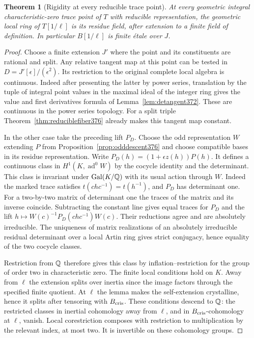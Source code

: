 \documentclass[a4paper,11pt]{article}
\newtheorem{theorem}[proposition]{Theorem}
\theoremstyle{definition}
\theoremstyle{remark}
\numberwithin{equation}{section}
\begin{document}
\begin{theorem}[Rigidity at every reducible trace point]
\label{thm:reduciblerigid379}
At every geometric integral characteristic-zero trace point
of \(T\) with reducible representation, the geometric local
ring of \(T[1/\ell]\) is its residue field, after extension
to a finite field of definition. In particular \(B[1/\ell]\)
is finite \'etale over \(J\).
\end{theorem}
\begin{proof}
Choose a finite extension \(J'\) where the point and its
constituents are rational and split. Any relative tangent
map at this point can be tested in
\(D=J'[\epsilon]/(\epsilon^2)\). Its restriction to the
original complete local algebra is continuous. Indeed after
presenting the latter by power series, translation by the
tuple of integral point values in the maximal ideal of the
integer ring gives the value and first derivatives formula
of Lemma~\ref{lem:detangent372}. These are continuous
in the power series topology. For a split triple
Theorem~\ref{thm:reduciblefiber376} already makes this
tangent map constant.

In the other case take the preceding lift \(P_D\).
Choose the odd representation \(W\) extending \(P\) from
Proposition~\ref{prop:odddescent376} and choose compatible
bases in its residue representation. Write
\(P_D(h)=(1+\epsilon z(h))P(h)\). It defines a continuous
class in \(H^1(K,\operatorname{ad}^0W)\) by the cocycle
identity and the determinant. This class is invariant under
\(\operatorname{Gal}(K/\mathbb Q)\) with its usual action through
\(W\). Indeed the marked trace satisfies
\(t(chc^{-1})=t(h^{-1})\), and \(P_D\) has determinant one.
For a two-by-two matrix of determinant one the traces of
the matrix and its inverse coincide. Subtracting the
constant line gives equal traces for \(P_D\) and the lift
\(h\mapsto W(c)^{-1}P_D(chc^{-1})W(c)\).
Their reductions agree and are absolutely irreducible.
The uniqueness of matrix realizations of an absolutely
irreducible residual determinant over a local Artin ring
gives strict conjugacy, hence equality of the two cocycle
classes.~\cite{VIII-VI-chenevier364}

Restriction from \(\mathbb Q\) therefore gives this class by
inflation--restriction for the group of order two in
characteristic zero. The finite local conditions hold on
\(K\). Away from \(\ell\) the extension splits over inertia
since the image factors through the specified finite quotient.
At \(\ell\) the lemma makes the self-extension crystalline,
hence it splits after tensoring with \(B_{\rm cris}\). These
conditions descend to \(\mathbb Q\): the restricted classes in
inertial cohomology away from \(\ell\), and in
\(B_{\rm cris}\)-cohomology at \(\ell\), vanish. Local
corestriction composes with restriction to multiplication
by the relevant index, at most two. It is invertible on
these cohomology groups.


\end{proof}
\end{document}
